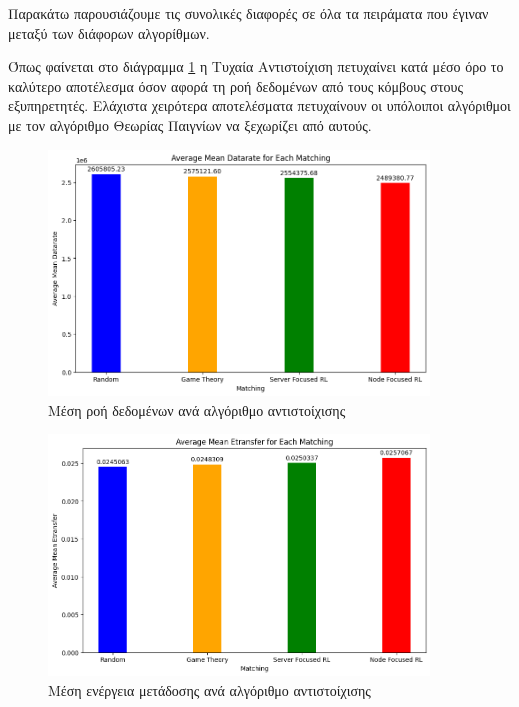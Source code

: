 Παρακάτω παρουσιάζουμε τις συνολικές διαφορές σε όλα τα πειράματα που έγιναν μεταξύ των διάφορων αλγορίθμων.

Όπως φαίνεται στο διάγραμμα \ref*{fig12} η Τυχαία Αντιστοίχιση πετυχαίνει κατά μέσο όρο το καλύτερο αποτέλεσμα όσον αφορά τη ροή δεδομένων από τους κόμβους στους εξυπηρετητές. Ελάχιστα χειρότερα αποτελέσματα πετυχαίνουν οι υπόλοιποι αλγόριθμοι με τον αλγόριθμο Θεωρίας Παιγνίων να ξεχωρίζει από αυτούς.

\begin{figure}[H]
    \centering
    \includegraphics[width=0.9\textwidth]{figures/chapter3/Average_Mean_Datarate.png}
    \caption{Μέση ροή δεδομένων ανά αλγόριθμο αντιστοίχισης}
    \label{fig12}
\end{figure}

\newpage

\begin{figure}[H]
    \centering
    \includegraphics[width=0.9\textwidth]{figures/chapter3/Average_Mean_Etransfer.png}
    \caption{Μέση ενέργεια μετάδοσης ανά αλγόριθμο αντιστοίχισης}
    \label{fig13}
\end{figure}

